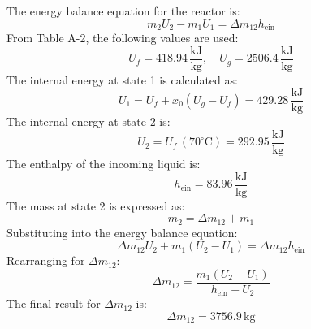 The energy balance equation for the reactor is:  
\[
m_2 U_2 - m_1 U_1 = \Delta m_{12} h_{\text{ein}}
\]  
From Table A-2, the following values are used:  
\[
U_f = 418.94 \, \frac{\text{kJ}}{\text{kg}}, \quad U_g = 2506.4 \, \frac{\text{kJ}}{\text{kg}}
\]  
The internal energy at state 1 is calculated as:  
\[
U_1 = U_f + x_0 (U_g - U_f) = 429.28 \, \frac{\text{kJ}}{\text{kg}}
\]  
The internal energy at state 2 is:  
\[
U_2 = U_f \, (70^\circ\text{C}) = 292.95 \, \frac{\text{kJ}}{\text{kg}}
\]  
The enthalpy of the incoming liquid is:  
\[
h_{\text{ein}} = 83.96 \, \frac{\text{kJ}}{\text{kg}}
\]  
The mass at state 2 is expressed as:  
\[
m_2 = \Delta m_{12} + m_1
\]  
Substituting into the energy balance equation:  
\[
\Delta m_{12} U_2 + m_1 (U_2 - U_1) = \Delta m_{12} h_{\text{ein}}
\]  
Rearranging for \( \Delta m_{12} \):  
\[
\Delta m_{12} = \frac{m_1 (U_2 - U_1)}{h_{\text{ein}} - U_2}
\]  
The final result for \( \Delta m_{12} \) is:  
\[
\Delta m_{12} = 3756.9 \, \text{kg}
\]